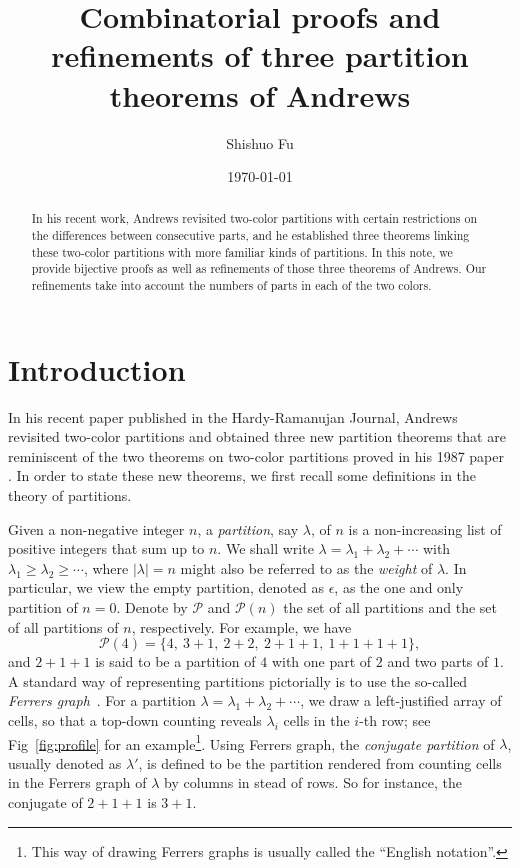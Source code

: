 \documentclass[11pt,reqno]{amsart}
\numberwithin{equation}{section}
\theoremstyle{plain}
\theoremstyle{definition}
\renewcommand{\P}{\mathcal{P}}
\begin{document}
\title{Combinatorial proofs and refinements of three partition theorems of Andrews}

\author[S. Fu]{Shishuo Fu}
\address[Shishuo Fu]{College of Mathematics and Statistics, Chongqing University, Chongqing 401331, P.R. China}

\date{\today}

\begin{abstract}
In his recent work, Andrews revisited two-color partitions with certain restrictions on the differences between consecutive parts, and he established three theorems linking these two-color partitions with more familiar kinds of partitions. In this note, we provide bijective proofs as well as refinements of those three theorems of Andrews. Our refinements take into account the numbers of parts in each of the two colors.
\end{abstract}




\maketitle
\section{Introduction}

In his recent paper \cite{and21} published in the Hardy-Ramanujan Journal, Andrews revisited two-color partitions and obtained three new partition theorems that are reminiscent of the two theorems on two-color partitions proved in his 1987 paper \cite{and87}. In order to state these new theorems, we first recall some definitions in the theory of partitions.

Given a non-negative integer $n$, a {\it partition}, say $\lambda$, of $n$ is a non-increasing list of positive integers that sum up to $n$. We shall write $\lambda=\lambda_1+\lambda_2+\cdots$ with $\lambda_1\ge \lambda_2\ge\cdots$, where $|\lambda|=n$ might also be referred to as the {\it weight} of $\lambda$. In particular, we view the empty partition, denoted as $\epsilon$, as the one and only partition of $n=0$. Denote by $\P$ and $\P(n)$ the set of all partitions and the set of all partitions of $n$, respectively. For example, we have
$$\P(4)=\{4,~3+1,~2+2,~2+1+1,~1+1+1+1\},$$
and $2+1+1$ is said to be a partition of $4$ with one part of $2$ and two parts of $1$. A standard way of representing partitions pictorially is to use the so-called {\it Ferrers graph}~\cite[p.~7]{andtp}. For a partition $\lambda=\lambda_1+\lambda_2+\cdots$, we draw a left-justified array of cells, so that a top-down counting reveals $\lambda_i$ cells in the $i$-th row; see Fig~\ref{fig:profile} for an example\footnote{This way of drawing Ferrers graphs is usually called the ``English notation''.}. Using Ferrers graph, the {\it conjugate partition} of $\lambda$, usually denoted as $\lambda'$, is defined to be the partition rendered from counting cells in the Ferrers graph of $\lambda$ by columns in stead of rows. So for instance, the conjugate of $2+1+1$ is $3+1$.
\end{document}
